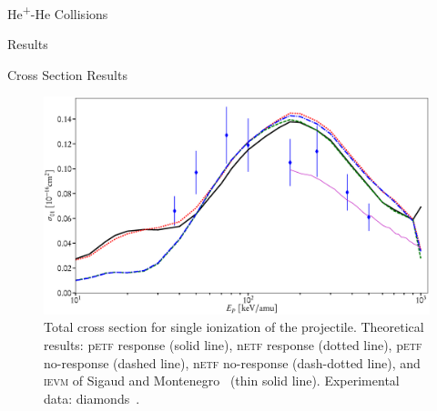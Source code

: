 \documentclass[letterpaper, 11 pt]{report}
\begin{document}
\begin{chapter}{\texorpdfstring{He\textsuperscript{+}}{He+}-He Collisions \label{chap:hephe}}
\begin{section}{Results \label{sec:hephe-disc}}
\begin{subsection}{Cross Section Results \label{sec:hephe-res}}
         \begin{figure}[t]
            \centering
            \includegraphics[width = \linewidth]{./images/hephe-cross/HepHe-201.eps}
            \caption[Total cross section for single ionization of the projectile in
                     He\textsuperscript{+}-He collisions.]
                    {Total cross section for single ionization of the projectile.
                     Theoretical results: p\textsc{etf} response (solid line), n\textsc{etf} response
                                          (dotted line), p\textsc{etf} no-response (dashed line),
                                          n\textsc{etf} no-response (dash-dotted line), and
                                          \textsc{ievm} of Sigaud and Montenegro~\cite{SM-03}
                                          (thin solid line).
                     Experimental data: diamonds~\cite{Dub-89}. \label{fig:cs201}}
         \end{figure}


\end{subsection}
\end{section}
\end{chapter}
\end{document}
